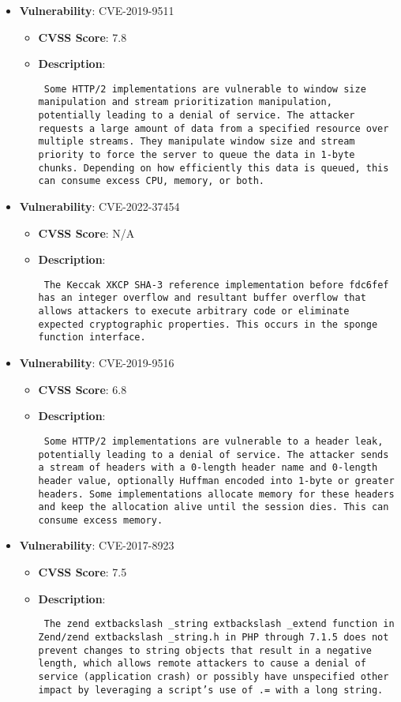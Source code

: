 \documentclass{article}
\begin{document}
\begin{itemize}
        \item \textbf{Vulnerability}: CVE-2019-9511
        \begin{itemize}
            \item \textbf{CVSS Score}:  7.8 
            \item \textbf{Description}: \parbox{\linewidth}{\texttt{ Some HTTP/2 implementations are vulnerable to window size manipulation and stream prioritization manipulation, potentially leading to a denial of service. The attacker requests a large amount of data from a specified resource over multiple streams. They manipulate window size and stream priority to force the server to queue the data in 1-byte chunks. Depending on how efficiently this data is queued, this can consume excess CPU, memory, or both. }}
        \end{itemize}
    
        \item \textbf{Vulnerability}: CVE-2022-37454
        \begin{itemize}
            \item \textbf{CVSS Score}:  N/A 
            \item \textbf{Description}: \parbox{\linewidth}{\texttt{ The Keccak XKCP SHA-3 reference implementation before fdc6fef has an integer overflow and resultant buffer overflow that allows attackers to execute arbitrary code or eliminate expected cryptographic properties. This occurs in the sponge function interface. }}
        \end{itemize}
    
        \item \textbf{Vulnerability}: CVE-2019-9516
        \begin{itemize}
            \item \textbf{CVSS Score}:  6.8 
            \item \textbf{Description}: \parbox{\linewidth}{\texttt{ Some HTTP/2 implementations are vulnerable to a header leak, potentially leading to a denial of service. The attacker sends a stream of headers with a 0-length header name and 0-length header value, optionally Huffman encoded into 1-byte or greater headers. Some implementations allocate memory for these headers and keep the allocation alive until the session dies. This can consume excess memory. }}
        \end{itemize}
    
        \item \textbf{Vulnerability}: CVE-2017-8923
        \begin{itemize}
            \item \textbf{CVSS Score}:  7.5 
            \item \textbf{Description}: \parbox{\linewidth}{\texttt{ The zend	extbackslash _string	extbackslash _extend function in Zend/zend	extbackslash _string.h in PHP through 7.1.5 does not prevent changes to string objects that result in a negative length, which allows remote attackers to cause a denial of service (application crash) or possibly have unspecified other impact by leveraging a script's use of .= with a long string. }}
        \end{itemize}
    

\end{itemize}
\end{document}
